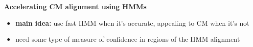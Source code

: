 \documentclass[landscape]{slides}
\begin{document}
\begin{slide}
\begin{center}
\large
\textbf{Accelerating CM alignment using HMMs}
\end{center}
\medskip
\begin{minipage}{6in}
\footnotesize
\begin{itemize}
\item
\textbf{main idea:} use fast HMM when it's accurate, appealing to CM when it's not
\item
need some type of measure of confidence in regions of the HMM alignment


\end{itemize}
\end{minipage}
\end{slide}
\end{document}
